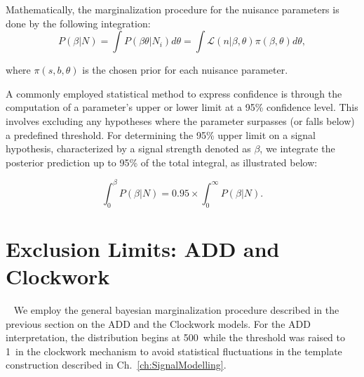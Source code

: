 Mathematically, the marginalization procedure for the nuisance parameters is done by the following integration:
\begin{equation}
    P(\beta |N) = \int P(\beta \theta |N_i) d\theta = \int \mathcal{L}(n| \beta, \theta) \pi(\beta,\theta) d\theta, 
\end{equation}

where  $\pi(s,b, \theta)$ is the chosen prior for each nuisance parameter. 

A commonly employed statistical method to express confidence is through the computation of a parameter's upper or lower limit at a 95\% confidence level. This involves excluding any hypotheses where the parameter surpasses (or falls below) a predefined threshold. For determining the 95\% upper limit on a signal hypothesis, characterized by a signal strength denoted as $\beta$, we integrate the posterior prediction up to 95\% of the total integral, as illustrated below:





\begin{equation}\label{95CL}
   \int^{\beta}_0 P(\beta |N)  = 0.95\times\int^{\infty}_0 P(\beta |N). 
\end{equation}

\section{Exclusion Limits: ADD and Clockwork}~\label{sec:ADDCWresults}
We employ the general bayesian marginalization procedure described in the previous section on the ADD and the Clockwork models. For the ADD interpretation, the \mgg distribution begins at 500~\GeV while the threshold was raised to 1~\TeV in the clockwork mechanism to avoid statistical fluctuations in the template construction described in Ch.~\ref{ch:SignalModelling}. 
